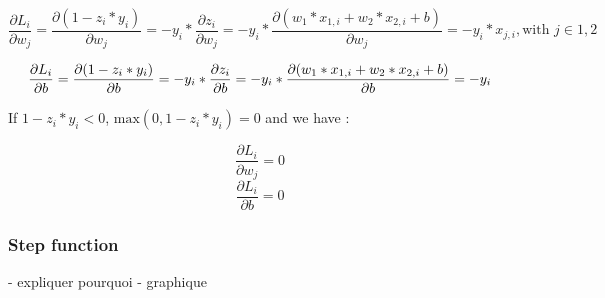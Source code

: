 \begin{equation}
    \frac{\partial L_i}{\partial w_j} = \frac{\partial (1 - z_i*y_i)}{\partial w_j} = -y_i*\frac{\partial z_i}{\partial w_j} = -y_i*\frac{\partial (w_1*x_{1,i} + w_2*x_{2,i} + b)}{\partial w_j} = -y_i*x_{j, i}, \text{with } j \in {1, 2}
\end{equation}

\begin{equation}
    \frac{\partial L_i}{\partial b} = \frac{\partial (1 - z_i*y_i)}{\partial b} = -y_i*\frac{\partial z_i}{\partial b} = -y_i*\frac{\partial (w_1*x_{1,i} + w_2*x_{2,i} + b)}{\partial b} = -y_i\\
\end{equation}

If $1 - z_i*y_i < 0$, $\text{max}(0, 1 - z_i*y_i) = 0$ and we have :

\begin{equation}
    \frac{\partial L_i}{\partial w_j} = 0
\end{equation}
\begin{equation}
    \frac{\partial L_i}{\partial b} = 0
\end{equation}

\subsubsection{Step function}
- expliquer pourquoi
- graphique 